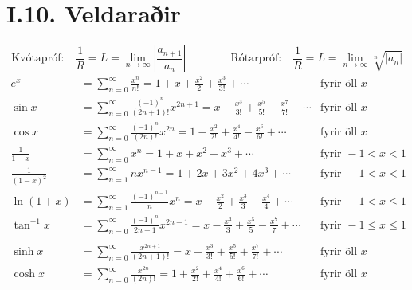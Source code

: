 \section*{I.10. Veldaraðir}
\[
  \text{Kvótapróf:}\quad \frac 1R = L=\lim_{n\to \infty} \left|\frac{a_{n+1}}{a_n}\right| \qquad\qquad
  \text{Rótarpróf:}\quad \frac 1R = L=\lim_{n\to \infty} \sqrt[n]{|a_n|}
\]
{\small
\begin{align*}
   e^x&=\sum_{n=0}^\infty\frac{x^n}{n!}
       =1+x+\frac{x^2}{2}+\frac{x^3}{3!}
       +\cdots
     &\mbox{fyrir öll }x\\
   \sin x&=  \sum_{n=0}^\infty\frac{(-1)^n}{(2n+1)!}x^{2n+1}
       =x-\frac{x^3}{3!}+\frac{x^5}{5!}-\frac{x^7}{7!}+\cdots
       &\mbox{fyrir öll }x\\ 
   \cos x&=  \sum_{n=0}^\infty\frac{(-1)^n}{(2n)!}x^{2n}
       =1-\frac{x^2}{2!}+\frac{x^4}{4!}-\frac{x^6}{6!}+\cdots
       &\mbox{fyrir öll }x\\
   \frac{1}{1-x}&=\sum_{n=0}^\infty x^n
       =1+x+x^2+x^3+\cdots
   &\mbox{fyrir }-1<x<1\\
   \frac{1}{(1-x)^2}&=\sum_{n=1}^\infty nx^{n-1}
       =1+2x+3x^2+4x^3+\cdots
   &\mbox{fyrir }-1<x<1\\
   \ln(1+x)&=  \sum_{n=1}^\infty\frac{(-1)^{n-1}}{n}x^n
       =x-\frac{x^2}{2}+\frac{x^3}{3}-\frac{x^4}{4}+\cdots
       &\mbox{fyrir }-1<x\leq 1\\
   \tan^{-1} x&=  \sum_{n=0}^\infty\frac{(-1)^n}{2n+1}x^{2n+1}
       =x-\frac{x^3}{3}+\frac{x^5}{5}-\frac{x^7}{7}+\cdots
       &\mbox{fyrir }-1\leq x\leq 1\\\\
   \sinh x&=  \sum_{n=0}^\infty\frac{x^{2n+1}}{(2n+1)!}
       =x+\frac{x^3}{3!}+\frac{x^5}{5!}+\frac{x^7}{7!}+\cdots
       &\mbox{fyrir öll } x\\
   \cosh x&=  \sum_{n=0}^\infty\frac{x^{2n}}{(2n)!}
       =1+\frac{x^2}{2!}+\frac{x^4}{4!}+\frac{x^6}{6!}+\cdots
       &\mbox{fyrir öll } x
      \end{align*}
    }



